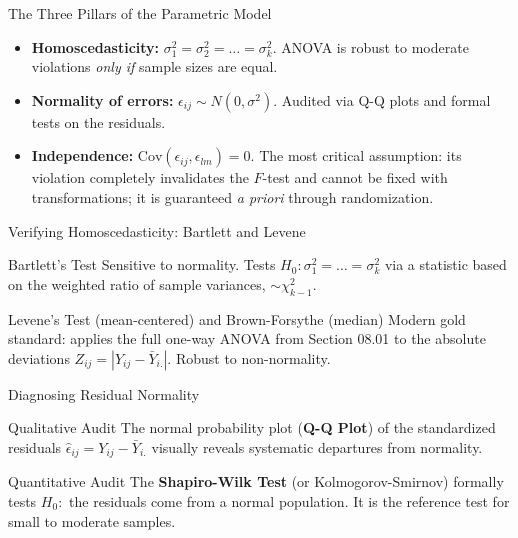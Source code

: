 \documentclass[10pt, aspectratio=169]{beamer}
\begin{document}
\begin{frame}{The Three Pillars of the Parametric Model}
  \footnotesize
  \begin{itemize}\itemsep=0.12cm
    \item \textbf{Homoscedasticity:} $\sigma_1^2=\sigma_2^2=\ldots=\sigma_k^2$. ANOVA is robust to moderate violations \emph{only if} sample sizes are equal. \pause
    \item \textbf{Normality of errors:} $\epsilon_{ij}\sim N(0,\sigma^2)$. Audited via Q-Q plots and formal tests on the residuals. \pause
    \item \textbf{Independence:} $\text{Cov}(\epsilon_{ij},\epsilon_{lm})=0$. The most critical assumption: its violation completely invalidates the $F$-test and cannot be fixed with transformations; it is guaranteed \emph{a priori} through randomization.
  \end{itemize}
\end{frame}

\begin{frame}{Verifying Homoscedasticity: Bartlett and Levene}
  \footnotesize
  \begin{block}{Bartlett's Test}
    Sensitive to normality. Tests $H_0:\sigma_1^2=\ldots=\sigma_k^2$ via a statistic based on the weighted ratio of sample variances, $\sim\chi^2_{k-1}$.
  \end{block}
  \pause

  \vspace{0.1cm}
  \begin{alertblock}{Levene's Test (mean-centered) and Brown-Forsythe (median)}
    Modern gold standard: applies the full one-way ANOVA from Section 08.01 to the absolute deviations $Z_{ij}=|Y_{ij}-\bar Y_{i.}|$. Robust to non-normality.
  \end{alertblock}
\end{frame}

\begin{frame}{Diagnosing Residual Normality}
  \footnotesize
  \begin{block}{Qualitative Audit}
    The normal probability plot (\textbf{Q-Q Plot}) of the standardized residuals $\hat\epsilon_{ij}=Y_{ij}-\bar Y_{i.}$ visually reveals systematic departures from normality.
  \end{block}
  \pause

  \vspace{0.1cm}
  \begin{alertblock}{Quantitative Audit}
    The \textbf{Shapiro-Wilk Test} (or Kolmogorov-Smirnov) formally tests $H_0:$ the residuals come from a normal population. It is the reference test for small to moderate samples.
  \end{alertblock}
\end{frame}
\end{document}
